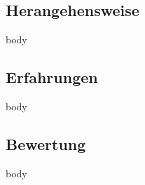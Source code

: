 \documentclass{beamer}
\begin{document}
  \subsection{Herangehensweise}
  \begin{frame}{\subsecname}
    body
  \end{frame}

  \subsection{Erfahrungen}
  \begin{frame}{\subsecname}
    body
  \end{frame}

  \subsection{Bewertung}
  \begin{frame}{\subsecname}
    body
  \end{frame}
\end{document}
